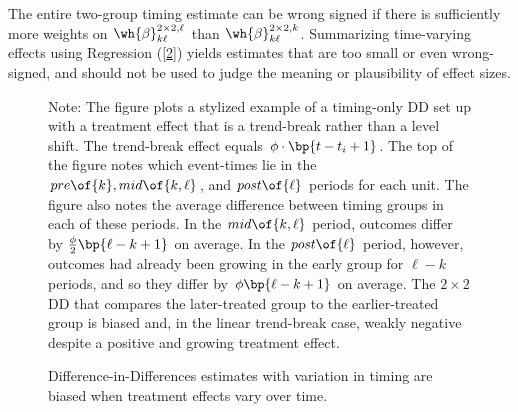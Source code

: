 \documentclass[12pt]{article}
\theoremstyle{definition}
\begin{document}
The entire two-group timing estimate can be wrong signed if there is sufficiently more weights on $\wh{\beta}_{k \ell}^{2 \times 2, \ell}$ than $\wh{\beta}_{k \ell}^{2 \times 2, k}$. Summarizing time-varying effects using Regression (\ref{2}) yields estimates that are too small or even wrong-signed,  and should not be used to judge the meaning or plausibility of effect sizes.


\begin{figure}[H]
    \noindent\caption{Difference-in-Differences estimates with variation in timing are biased when treatment effects vary over time.}
    \begin{center}
    \end{center}
    \medskip
    {\footnotesize Note: The figure plots a stylized example of a timing-only DD set up with a treatment effect that is a trend-break rather than a level shift. The trend-break effect equals $\phi \cdot \bp{t-t_i + 1}$. The top of the figure notes which event-times lie in the $pre\of{k}, mid\of{k, \ell}$, and $post\of{\ell}$ periods for each unit. The figure also notes the average difference between timing groups in each of these periods. In the $mid\of{k,\ell}$ period, outcomes differ by $\frac{\phi}{2} \bp{\ell - k + 1}$ on average. In the $post\of{\ell}$ period, however, outcomes had already been growing in the early group for $\ell - k$ periods, and so they differ by $\phi \bp{\ell - k + 1}$ on average. The $2\times2$ DD that compares the later-treated group to the earlier-treated group is biased and, in the linear trend-break case, weakly negative despite a positive and growing treatment effect.}
    \label{goodman-baconDifferenceinDifferencesVariationTreatment2021_fig3}
\end{figure}
\end{document}
